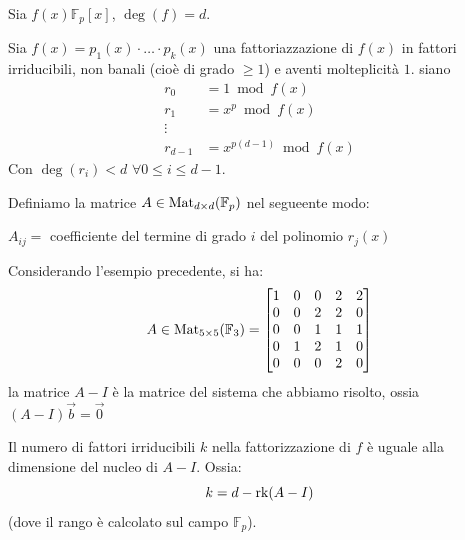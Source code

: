 \documentclass[../main.tex]{subfiles}
\begin{document}
Sia $f(x) \mathbb{F}_p[x]$, $\deg(f) = d$.

Sia $f(x) = p_1(x)\cdot \ldots \cdot p_k(x)$ una fattoriazzazione di $f(x)$ in fattori irriducibili, non banali (cioè di grado $\geq 1$) e aventi molteplicità $1$. siano
\begin{align*}
    r_0       & = 1 \bmod f(x)            \\
    r_1       & = x^p \bmod f(x)          \\
    \vdots    &                           \\
    r_{d - 1} & = x^{p(d - 1)} \bmod f(x)
\end{align*}
Con $\deg(r_i) < d$ $\forall 0 \leq i \leq d - 1$.

Definiamo la matrice $A \in \operatorname{Mat}_{d \times d}(\mathbb{F}_p)$ nel segueente modo:

$A_{ij} = $ coefficiente del termine di grado $i$ del polinomio $r_j(x)$
\begin{example}
    Considerando l'esempio precedente, si ha:
    \begin{equation*}
        A \in \operatorname{Mat}_{5 \times 5}(\mathbb{F}_3) =
        \begin{bmatrix}
            1 & 0 & 0 & 2 & 2 \\
            0 & 0 & 2 & 2 & 0 \\
            0 & 0 & 1 & 1 & 1 \\
            0 & 1 & 2 & 1 & 0 \\
            0 & 0 & 0 & 2 & 0
        \end{bmatrix}
    \end{equation*}
    la matrice $A - I$ è la matrice del sistema che abbiamo risolto, ossia $(A - I)\overrightarrow{b} = \overrightarrow{0}$
\end{example}

\begin{theorem}
    Il numero di fattori irriducibili $k$ nella fattorizzazione di $f$ è uguale alla dimensione del nucleo di $A - I$. Ossia:
    \begin{equation*}
        k = d - \operatorname{rk}(A - I)
    \end{equation*}
    (dove il rango è calcolato sul campo $\mathbb{F}_p$).
\end{theorem}
\end{document}
